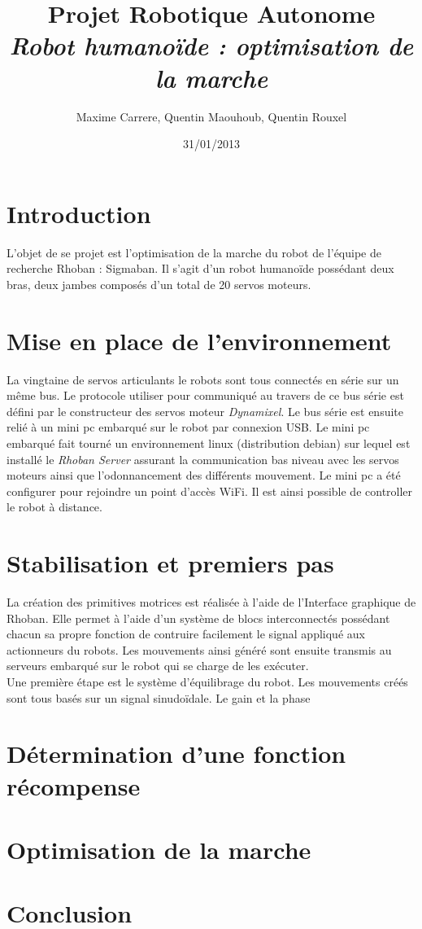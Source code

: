 \documentclass[11pt]{article}
\title{Projet Robotique Autonome\\
\textit{Robot humanoïde : optimisation de la marche}}
\author{Maxime Carrere, Quentin Maouhoub, Quentin Rouxel}
\date{31/01/2013}
\begin{document}
\maketitle

\section{Introduction}

L'objet de se projet est l'optimisation de la marche du robot de l'équipe 
de recherche Rhoban : Sigmaban. Il s'agit d'un robot humanoïde possédant deux bras,
deux jambes composés d'un total de 20 servos moteurs.

\section{Mise en place de l'environnement}

La vingtaine de servos articulants le robots sont tous connectés en série sur un même 
bus. Le protocole utiliser pour communiqué au travers de ce bus série est défini par le
constructeur des servos moteur \textit{Dynamixel}. Le bus série est ensuite relié à un mini pc
embarqué sur le robot par connexion USB. Le mini pc embarqué fait tourné un environnement linux
(distribution debian) sur lequel est installé le \textit{Rhoban Server} assurant la communication
bas niveau avec les servos moteurs ainsi que l'odonnancement des différents mouvement. Le mini pc
a été configurer pour rejoindre un point d'accès WiFi. Il est ainsi possible de controller le robot
à distance.

\section{Stabilisation et premiers pas}

La création des primitives motrices est réalisée à l'aide de l'Interface graphique de Rhoban.
Elle permet à l'aide d'un système de blocs interconnectés possédant chacun sa propre fonction
de contruire facilement le signal appliqué aux actionneurs du robots. Les mouvements ainsi généré
sont ensuite transmis au serveurs embarqué sur le robot qui se charge de les exécuter.\\

Une première étape est le système d'équilibrage du robot. 
Les mouvements créés sont tous basés sur un signal sinudoïdale. Le gain et la phase

\section{Détermination d'une fonction récompense}
\section{Optimisation de la marche}
\section{Conclusion}
\end{document}
